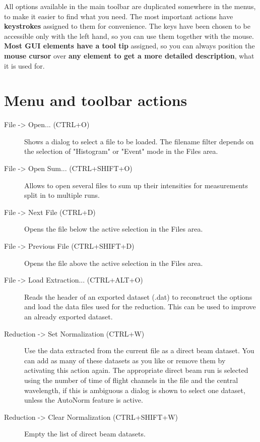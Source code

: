  All options available in the main toolbar are duplicated somewhere in the menus, to make it easier to find what you need.
 The most important actions have \textbf{keystrokes} assigned to them for convenience. 
 The keys have been chosen to be accessible only with the left hand, so you can use them together with the mouse.
 \textbf{Most GUI elements have a tool tip} assigned, so you can always position the \textbf{mouse cursor} over \textbf{any element to get a more detailed description}, what it is used for.


\section{Menu and toolbar actions}
  
  \begin{description}
   \item[{ File -> Open... (CTRL+O)}] Shows a dialog to select a file to be loaded. The filename filter depends on the selection of "Histogram" or "Event" mode in the Files area.
   \item[File -> Open Sum... (CTRL+SHIFT+O)] Allows to open several files to sum up their intensities for measurements split in to multiple runs.
   \item[{ File -> Next File (CTRL+D)}] Opens the file below the active selection in the Files area.
   \item[{ File -> Previous File (CTRL+SHIFT+D)}] Opens the file above the active selection in the Files area.
   \item[File -> Load Extraction... (CTRL+ALT+O)] Reads the header of an exported dataset (.dat) to reconstruct the options and load the data files used for the reduction. This can be used to improve an already exported dataset.
   
   \item[{ Reduction -> Set Normalization (CTRL+W)}] Use the data extracted from the current file as a direct beam dataset. You can add as many of these datasets as you like or remove them by activating this action again. The appropriate direct beam run is selected using the number of time of flight channels in the file and the central wavelength, if this is ambiguous a dialog is shown to select one dataset, unless the AutoNorm feature is active.
   \item[{ Reduction -> Clear Normalization (CTRL+SHIFT+W)}] Empty the list of direct beam datasets.
   

\end{description}

